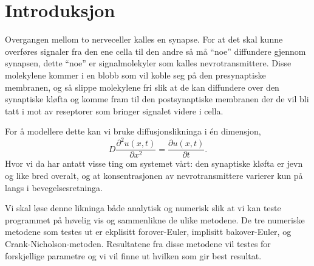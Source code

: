 \documentclass[norsk, 10pt]{article}
\begin{document}

\abstract{}

\section*{Introduksjon}
Overgangen mellom to nerveceller kalles en synapse. For at det skal kunne overføres signaler fra den ene cella til den andre så må ``noe'' diffundere gjennom synapsen, dette ``noe'' er signalmolekyler som kalles nevrotransmittere. Disse molekylene kommer i en blobb som vil koble seg på den presynaptiske membranen,  og så slippe molekylene fri slik at de kan diffundere over den synaptiske kløfta og komme fram til den postsynaptiske membranen der de vil bli tatt i mot av reseptorer som bringer signalet videre i cella.

For å modellere dette kan vi bruke diffusjonslikninga i én dimensjon,
$$ D\frac{\partial^2u(x,t)}{\partial x^2} = \frac{\partial u(x,t)}{\partial t}. $$
Hvor vi da har antatt visse ting om systemet vårt: den synaptiske kløfta er jevn og like bred overalt, og at konsentrasjonen av nevrotransmittere varierer kun på langs i bevegelsesretninga.

Vi skal løse denne likninga både analytisk og numerisk slik at vi kan teste programmet på høvelig vis og sammenlikne de ulike metodene. De tre numeriske metodene som testes ut er ekplisitt forover-Euler, implisitt bakover-Euler, og Crank-Nicholson-metoden. Resultatene fra disse metodene vil testes for forskjellige parametre og vi vil finne ut hvilken som gir best resultat.
\end{document}

